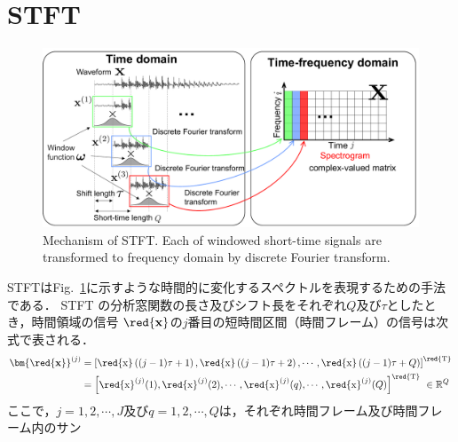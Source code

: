 \section{STFT}
\label{sec:stft}
\begin{figure}[t]
    \begin{center}
        \includegraphics[width=0.95\columnwidth]{figures/stft.pdf}
    \end{center}
    \vspace{-8pt}
	\caption{Mechanism of STFT. Each of windowed short-time signals are transformed to frequency domain by discrete Fourier transform.}
	\label{fig:stft}
\end{figure}
STFTはFig.~\ref{fig:stft}に示すような時間的に変化するスペクトルを表現するための手法である．
STFT の分析窓関数の長さ及びシフト長をそれぞれ$Q$及び$\tau$としたとき，時間領域の信号
$\red{\mathbf{x}}$の$j$番目の短時間区間（時間フレーム）の信号は次式で表される．
\begin{align}
    \bm{\red{\mathbf{x}}}^{(j)} &= \left[\red{\mathrm{x}}\left((j-1)\tau+1\right), \red{\mathrm{x}}\left((j-1)\tau+2\right), \cdots , \red{\mathrm{x}}\left((j-1)\tau+Q\right) \right]^{\red{\mathrm{T}}}\\
    &= \left[
    \red{\mathrm{x}}^{(j)}(1),\red{\mathrm{x}}^{(j)}(2),\cdots , \red{\mathrm{x}}^{(j)}(q), \cdots , \red{\mathrm{x}}^{(j)}(Q)
    \right]^{\red{\mathrm{T}}}~\in \mathbb{R}^{Q}
\end{align}
ここで，$j= 1, 2, \cdots , J$及び$q= 1, 2, \cdots , Q$は，それぞれ時間フレーム及び時間フレーム内のサン
